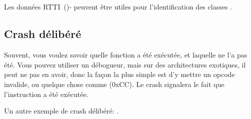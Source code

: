 \subsection{\Cpp}

Les données \ac{RTTI}~()- peuvent être utiles pour l'identification des
classes \Cpp.

\subsection{Crash délibéré}

Souvent, vous voulez savoir quelle fonction a été exécutée, et laquelle ne l'a pas
été.
Vous pouvez utiliser un débogueur, mais sur des architectures exotiques, il peut
ne pas en avoir, donc la façon la plus simple est d'y mettre un opcode invalide,
ou quelque chose comme  (0xCC).
Le crash signalera le fait que l'instruction a été exécutée.

Un autre exemple de crash délibéré: .


